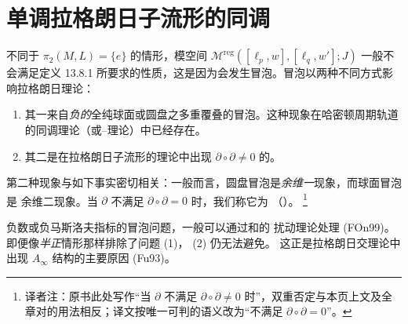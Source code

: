 \chapter{单调拉格朗日子流形的\personFloer{}同调}
\label{ch:monotone-lagrangian-floer}

不同于 $\pi_2(M,L)=\{e\}$ 的情形，模空间
$\mathcal M^{\mathrm{reg}}([\ell_p,w],[\ell_q,w'];J)$ 一般不会满足定义
13.8.1 所要求的性质，这是因为会发生冒泡。冒泡以两种不同方式影响拉格朗日\personFloer{}理论：

\begin{enumerate}[label=(\arabic*)]
\item 其一来自\emph{负的}全纯球面或圆盘之多重覆叠的冒泡。这种现象在哈密顿周期轨道的\personFloer{}同调理论（或\personGromov{}--\personWitten{}理论）中已经存在。
\item 其二是在拉格朗日子流形的\personFloer{}理论中出现
$\partial\circ\partial\neq0$ 的\emph{\termAnomaly{}}。
\end{enumerate}

第二种现象与如下事实密切相关：一般而言，圆盘冒泡是\emph{余维一}现象，而球面冒泡是
余维二现象。当 $\partial$ 不满足 $\partial\circ\partial=0$ 时，我们称它为
（\personFloer{}）\emph{\termPreBoundaryMap{}}。
\footnote{译者注：原书此处写作“当 $\partial$ 不满足
$\partial\circ\partial\neq0$ 时”，双重否定与本页上文及全章对\termPreBoundaryMap{}的用法相反；译文按唯一可判的语义改为“不满足
$\partial\circ\partial=0$”。}

负\personChern{}数或负马斯洛夫指标的冒泡问题，一般可以通过\termKuranishiStructure{}和\termMultiValuedSection{}的
扰动理论处理 (FOn99)。即便像\emph{半正}情形那样排除了问题 (1)，\termAnomaly{} (2) 仍无法避免。
这正是拉格朗日交\personFloer{}理论中出现 $A_\infty$ 结构的主要原因 (Fu93)。






